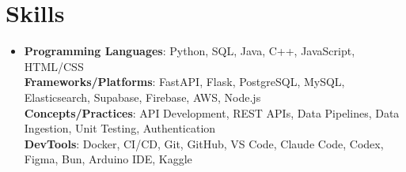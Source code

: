 \documentclass[letterpaper,10pt]{article}
\begin{document}
    \resumeSubHeadingListEnd


\section{Skills}
 \begin{itemize}[leftmargin=0.15in, label={}]
    \item{
     \textbf{Programming Languages}{: Python, SQL, Java, C++, JavaScript, HTML/CSS} \\
     \textbf{Frameworks/Platforms}{: FastAPI, Flask, PostgreSQL, MySQL, Elasticsearch, Supabase, Firebase, AWS, Node.js} \\
     \textbf{Concepts/Practices}{: API Development, REST APIs, Data Pipelines, Data Ingestion, Unit Testing, Authentication} \\
     \textbf{DevTools}{: Docker, CI/CD, Git, GitHub, VS Code, Claude Code, Codex, Figma, Bun, Arduino IDE, Kaggle}
    }
 \end{itemize}
 \vspace{3.53pt}

\end{document}
